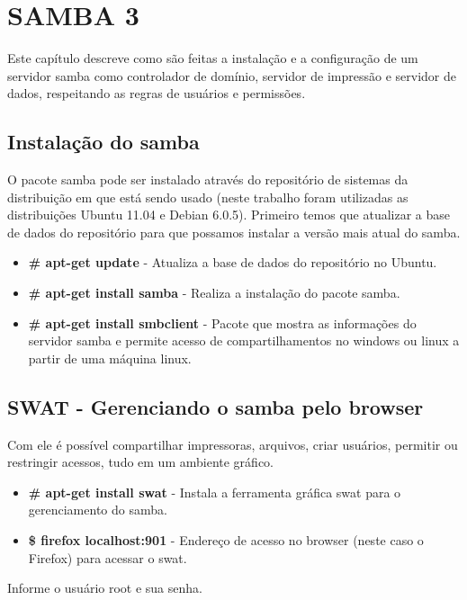 \chapter{SAMBA 3}
Este capítulo descreve como são feitas a instalação e a configuração de um servidor samba como controlador de domínio, servidor de impressão e servidor de dados, respeitando as regras de usuários e permissões.

\section{Instalação do samba}

O pacote samba pode ser instalado através do repositório de sistemas da distribuição em que está sendo usado (neste trabalho foram utilizadas as distribuições Ubuntu 11.04 e Debian 6.0.5). Primeiro temos que atualizar a base de dados do repositório para que possamos instalar a versão mais atual do samba.

\begin{itemize}
    \item \textbf{\# apt-get update} - Atualiza a base de dados do repositório no Ubuntu.
    \item \textbf{\# apt-get install samba} - Realiza a instalação do pacote samba.
    \item \textbf{\# apt-get install smbclient} - Pacote que mostra as informações do servidor samba e permite acesso de compartilhamentos no windows ou linux a partir de uma máquina linux.
\end{itemize}

\section{SWAT - Gerenciando o samba pelo browser}

Com ele é possível compartilhar impressoras, arquivos, criar usuários, permitir ou restringir acessos, tudo em um ambiente gráfico.

\begin{itemize}
 \item \textbf{\# apt-get install swat} - Instala a ferramenta gráfica swat para o gerenciamento do samba.
    \item \textbf{\$ firefox localhost:901} - Endereço de acesso no browser (neste caso o Firefox) para acessar o swat.
\end{itemize}

Informe o usuário root e sua senha.

